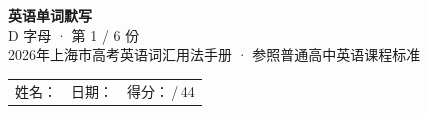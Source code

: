 \documentclass[10pt,a4paper]{article}
\begin{document}
\pagestyle{plain}

\begin{center}
{\LARGE\bfseries 英语单词默写}\\[0.22em]
{\large D 字母 · 第 1 / 6 份}\\[0.18em]
{\small 2026年上海市高考英语词汇用法手册 · 参照普通高中英语课程标准}
\end{center}

\vspace{0.25em}
\noindent\begin{tabular}{@{}p{}@{}p{}@{}p{}@{}}
姓名：\underline{\hspace{2.0cm}} & 日期：\underline{\hspace{2.0cm}} & 得分：\underline{\hspace{1.3cm}}\,/\,44 \\
\end{tabular}

\vspace{0.3em}

\vspace{0.08em}
\end{document}
